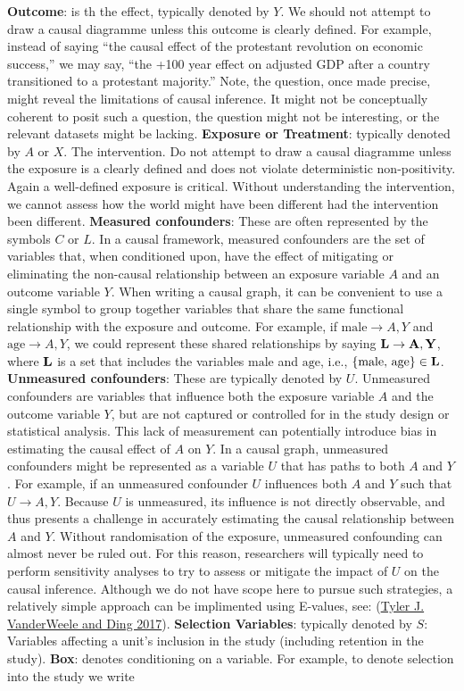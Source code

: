 \documentclass[
  singlecolumn]{report}
\begin{document}
\textbf{Outcome}: is th the effect, typically denoted by \(Y\). We
should not attempt to draw a causal diagramme unless this outcome is
clearly defined. For example, instead of saying ``the causal effect of
the protestant revolution on economic success,'' we may say, ``the +100
year effect on adjusted GDP after a country transitioned to a protestant
majority.'' Note, the question, once made precise, might reveal the
limitations of causal inference. It might not be conceptually coherent
to posit such a question, the question might not be interesting, or the
relevant datasets might be lacking. \textbf{Exposure or Treatment}:
typically denoted by \(A\) or \(X\). The intervention. Do not attempt to
draw a causal diagramme unless the exposure is a clearly defined and
does not violate deterministic non-positivity. Again a well-defined
exposure is critical. Without understanding the intervention, we cannot
assess how the world might have been different had the intervention been
different. \textbf{Measured confounders}: These are often represented by
the symbols \(C\) or \(L\). In a causal framework, measured confounders
are the set of variables that, when conditioned upon, have the effect of
mitigating or eliminating the non-causal relationship between an
exposure variable \(A\) and an outcome variable \(Y\). When writing a
causal graph, it can be convenient to use a single symbol to group
together variables that share the same functional relationship with the
exposure and outcome. For example, if \(\text{male} \to A, Y\) and
\(\text{age} \to A, Y\), we could represent these shared relationships
by saying \(\bf{L} \to A, Y\), where \(\bf{L}\) is a set that includes
the variables \(\text{male}\) and \(\text{age}\), i.e.,
\(\{\text{male, age}\}\in \bf{L}\). \textbf{Unmeasured confounders}:
These are typically denoted by \(U\). Unmeasured confounders are
variables that influence both the exposure variable \(A\) and the
outcome variable \(Y\), but are not captured or controlled for in the
study design or statistical analysis. This lack of measurement can
potentially introduce bias in estimating the causal effect of \(A\) on
\(Y\). In a causal graph, unmeasured confounders might be represented as
a variable \(U\) that has paths to both \(A\) and \(Y\). For example, if
an unmeasured confounder \(U\) influences both \(A\) and \(Y\) such that
\(U \to A, Y\). Because \(U\) is unmeasured, its influence is not
directly observable, and thus presents a challenge in accurately
estimating the causal relationship between \(A\) and \(Y\). Without
randomisation of the exposure, unmeasured confounding can almost never
be ruled out. For this reason, researchers will typically need to
perform sensitivity analyses to try to assess or mitigate the impact of
\(U\) on the causal inference. Although we do not have scope here to
pursue such strategies, a relatively simple approach can be implimented
using E-values, see: (\protect\hyperlink{ref-vanderweele2017}{Tyler J.
VanderWeele and Ding 2017}). \textbf{Selection Variables}: typically
denoted by \(S\): Variables affecting a unit's inclusion in the study
(including retention in the study). \textbf{Box}: denotes conditioning
on a variable. For example, to denote selection into the study we write
\end{document}

